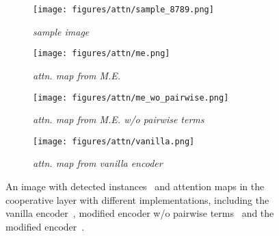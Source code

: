 \documentclass[10pt,twocolumn,letterpaper]{article}
\begin{document}
\begin{figure*}[t]
	\begin{subfigure}[t]{0.25\linewidth}
		\centering
		\texttt{[image: figures/attn/sample\_8789.png]}
		\caption{\textit{sample image}}
		\label{fig:sample-image}
	\end{subfigure}
    \hspace{-12pt}
	\begin{subfigure}[t]{0.245\linewidth}
		\centering
		\texttt{[image: figures/attn/me.png]}
		\caption{\textit{attn. map from M.E.}}
		\label{fig:attn-me}
	\end{subfigure}
    \hspace{4pt}
	\begin{subfigure}[t]{0.24\linewidth}
		\centering
		\texttt{[image: figures/attn/me\_wo\_pairwise.png]}
		\caption{\textit{attn. map from M.E. w/o pairwise terms}}
		\label{fig:attn-me-wo-pairwise}
	\end{subfigure}
    \hspace{5pt}
	\begin{subfigure}[t]{0.24\linewidth}
		\centering
		\texttt{[image: figures/attn/vanilla.png]}
		\caption{\textit{attn. map from vanilla encoder}}
		\label{fig:attn-vanilla}
	\end{subfigure}
    \caption{An image with detected instances~ and attention maps in the cooperative layer with different implementations, including the vanilla encoder~, modified encoder w/o pairwise terms~ and the modified encoder~.}
    \label{fig:attn-comparison}
\end{figure*}
\end{document}
